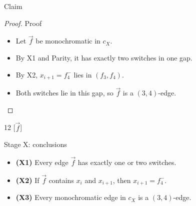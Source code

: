 \begin{frame}[t]{}
  \small{}
  \claimreminder{\Xone\Xtwo\switchparity}

  \begin{lemma}{Claim}
    \Xthree
  \end{lemma}

  \begin{proof}{Proof}
    \begin{itemize}
      \item<1-> Let $\vec f$ be monochromatic in $c_X$.
      \item<2-> By X1 and Parity, it has exactly two switches in one gap.
      \item<3-> By X2, $x_{i+1}=f_4^-$ lies in $(f_3,f_4)$.
      \item<4-> Both switches lie in this gap, so $\vec f$ is a $(3,4)$-edge.
    \end{itemize}
  \end{proof}

  \begin{center}
    \begin{shiftchain}[
      column sep=6mm, row sep=6mm, dot radius=3.0pt,
      label font=\scriptsize,
      switches={7,11}, switch labels={7/$x_i$,11/$x_{i+1}$},
    ]{12}
      [$\vec f$]
    \end{shiftchain}
  \end{center}
\end{frame}

\begin{frame}{Stage X: conclusions}
  \begin{itemize}
    \item \textbf{(X1)} Every edge $\vec f$ has exactly one or two switches.
    \item \textbf{(X2)} If $\vec f$ contains $x_i$ and $x_{i+1}$,
      then $x_{i+1}=f_4^-$.
    \item \textbf{(X3)} Every monochromatic edge in $c_X$ is a $(3,4)$-edge.
  \end{itemize}
\end{frame}
